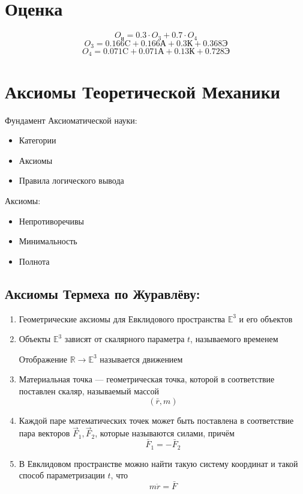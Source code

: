 \documentclass[12pt, a4paper, openany, crop=false]{standalone}
\begin{document}
\section*{Оценка}
\[
O_{\text{и}} = 0.3 \cdot O_3 + 0.7 \cdot O_4
\]
\[
O_3 = 0.166 \text{C} + 0.166 \text{А} +  0.3 \text{К} + 0.368 \text{Э}
\]
\[
O_4 = 0.071 \text{C} + 0.071 \text{А} +  0.13 \text{К} + 0.728 \text{Э}
\]
\section{Аксиомы Теоретической Механики}
\begin{minipage}[t]{0.48\textwidth}
Фундамент Аксиоматической науки:
\begin{itemize}
    \item Категории
    \item Аксиомы %
    \item Правила логического вывода
\end{itemize}
\end{minipage}
\hfill
\begin{minipage}[t]{0.48\textwidth}
Аксиомы: %
\begin{itemize}
    \item Непротиворечивы
    \item Минимальность
    \item Полнота
\end{itemize}
\end{minipage}
\subsection{Аксиомы Термеха по Журавлёву:}
\begin{enumerate}
    \item Геометрические аксиомы для Евклидового пространства $\mathbb E^3$ и его объектов
    \item Объекты $\mathbb E^3$ зависят от скалярного параметра $t$, называемого временем
    
    Отображение $\mathbb R \rightarrow \mathbb E^3$ называется движением
    \item Материальная точка — геометрическая точка, которой в соответствие поставлен скаляр, называемый массой
    $$(\bar r, m)$$
    \item Каждой паре математических точек может быть поставлена в соответствие пара векторов $\vec F_1, \vec F_2$, которые называются силами, причём
$$\bar F_1 = - \bar F_2$$
    \item В Евклидовом пространстве можно найти такую систему координат и такой способ параметризации $t$, что 
\[m \ddot r = \bar F\]
\end{enumerate}
\end{document}
